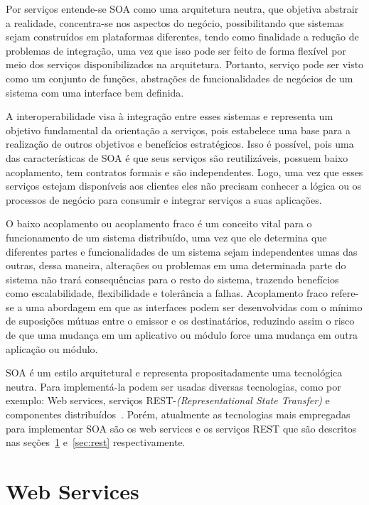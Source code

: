Por serviços entende-se SOA como uma arquitetura neutra, que objetiva abstrair a realidade, concentra-se nos aspectos do negócio, possibilitando que sistemas sejam construídos em plataformas diferentes, tendo como finalidade a redução de problemas de integração, uma vez que isso  pode ser feito de forma flexível por meio dos serviços disponibilizados na arquitetura. Portanto, serviço pode ser visto como um conjunto de funções, abstrações de funcionalidades de negócios de um sistema com uma interface bem definida.

A interoperabilidade visa à integração entre esses sistemas e representa um objetivo fundamental da orientação a serviços, pois estabelece uma base para a realização de outros objetivos e benefícios estratégicos. Isso é possível, pois uma das características de SOA é que seus serviços são reutilizáveis, possuem baixo acoplamento, tem contratos formais e são independentes. Logo, uma vez que esses serviços estejam disponíveis aos clientes eles não precisam conhecer a lógica ou os processos de negócio para consumir e integrar serviços a suas aplicações.

O baixo acoplamento ou acoplamento fraco é um conceito vital para o funcionamento de um sistema distribuído, uma vez que ele determina que diferentes partes e funcionalidades de um sistema sejam independentes umas das outras, dessa maneira, alterações ou problemas em uma determinada parte do sistema não trará consequências para o resto do sistema, trazendo benefícios como escalabilidade, flexibilidade e tolerância a falhas. Acoplamento fraco refere-se a uma abordagem em que as interfaces podem ser desenvolvidas com o mínimo de suposições mútuas entre o emissor e os destinatários, reduzindo assim o risco de que uma mudança em um aplicativo ou módulo force uma mudança em outra aplicação ou módulo.

SOA é um estilo arquitetural e representa propositadamente uma tecnológica neutra. Para implementá-la podem ser usadas diversas tecnologias, como por exemplo: Web services, serviços REST-\emph{(Representational State Transfer)} e componentes distribuídos~\cite{erl2012soa}. Porém, atualmente as tecnologias mais empregadas para implementar SOA são os web services e os serviços REST que são descritos nas seções~\ref{sec:webservice} e~\ref{sec:rest} respectivamente.

\section{Web Services}\label{sec:webservice}

